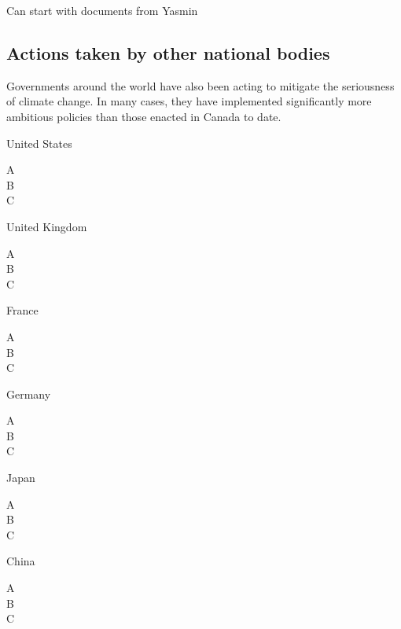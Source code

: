 \begin{itemize}
\textsf{Can start with documents from Yasmin}


		
		\subsection{Actions taken by other national bodies}
		
Governments around the world have also been acting to mitigate the seriousness of climate change. In many cases, they have implemented significantly more ambitious policies than those enacted in Canada to date.

United States
\begin{description}
	\item[A]
	\item[B]
	\item[C]
\end{description}



United Kingdom
\begin{description}
	\item[A]
	\item[B]
	\item[C]
\end{description}



France
\begin{description}
	\item[A]
	\item[B]
	\item[C]
\end{description}



Germany
\begin{description}
	\item[A]
	\item[B]
	\item[C]
\end{description}



Japan
\begin{description}
	\item[A]
	\item[B]
	\item[C]
\end{description}




China
\begin{description}
	\item[A]
	\item[B]
	\item[C]
\end{description}




\end{itemize}
